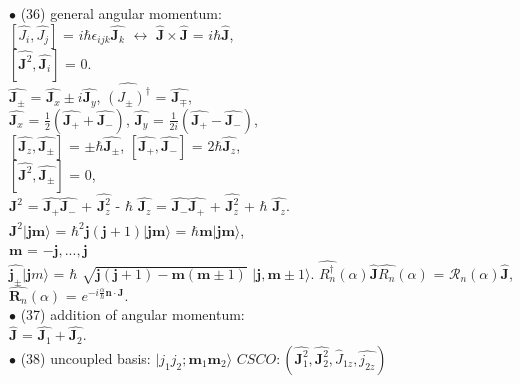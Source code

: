 \documentclass[10pt,fancy]{elegantbook}
\begin{document}
{$\bullet$ (36) general angular momentum: \\
$ [\hat{J_i}, \hat{J_j}]$ = $i \hbar \epsilon_{ijk} \hat{\mathbf J_k}$ $\longleftrightarrow$ $\hat{\mathbf J} \times \hat{\mathbf J}$ = $ i \hbar \hat{\mathbf J}$,  \\
$[\hat{\mathbf J^2},\hat{\mathbf J_i}] $ = 0.  \\  
$ \hat{\mathbf J_ \pm}$ = $\hat{\mathbf J_x} \pm i \hat{\mathbf J_y}$, $ \hat{(J_ \pm)^\dagger}$ = $\hat{\mathbf J_\mp}$, \\
$\hat{\mathbf J_x}$ = $\frac{1}{2} (\hat{\mathbf J_+} + \hat{\mathbf J_-})$, $\hat{\mathbf J_y}$ = $\frac{1}{2i}(\hat{\mathbf J_+} - \hat{\mathbf J_-})$,  \\  
$[\hat{\mathbf J_z}, \hat{\mathbf J_ \pm}]$ = $ \pm \hbar \hat{\mathbf J_ \pm}$, $[\hat{\mathbf J_+}, \hat{\mathbf J_-}]$ = $2 \hbar \hat{\mathbf J_z}$,  \\
$[\hat{\mathbf J^2}, \hat{\mathbf J_\pm}]$ = 0,  \\  
$\hat{\mathbf J^2}$ = $\hat{\mathbf J_+} \hat{\mathbf J_-}$ + $\hat{\mathbf J^2_z}$ - $\hbar$ $\hat{\mathbf J_z}$ = $\hat{\mathbf J_-} \hat{\mathbf J_+}$ + $\hat{\mathbf J^2_z}$ + $\hbar$ $\hat{\mathbf J_z}$.  \\  
$\hat{\mathbf J^2} |{\mathbf {jm}} \rangle$ = $\hbar^2 \mathbf j(\mathbf j + 1) | \mathbf {jm} \rangle$ = $ \hbar \mathbf m | \mathbf {jm} \rangle$,  \\  
$\mathbf m$ = $ - \mathbf j,...,\mathbf j$  \\                           
$\hat{\mathbf j_\pm} | {\mathbf jm} \rangle$ = $\hbar$ $\sqrt{{{\mathbf j} {(\mathbf j + 1)}} - {\mathbf m}{(\mathbf m \pm 1)}}$ $ | \mathbf j, \mathbf m \pm 1 \rangle$.  
$\hat{R^\dagger_n}(\alpha) \hat{\mathbf J} \hat{R_n}(\alpha)$ = $\mathcal R_n (\alpha) \hat{\mathbf J}$,  \\ 
$\hat{\mathbf R_n}(\alpha)$ = $e^{ - i \frac{\alpha}{\hbar} {\mathbf n} \cdot {\mathbf J}}$. \\

$\bullet$ (37) addition of angular momentum:  \\ 
$\hat{\mathbf J}$ = $\hat{\mathbf J_1} + \hat{\mathbf J_2}$.  \\

$\bullet$ (38) uncoupled basis: $ | j_1 j_2; \mathbf m_1 \mathbf m_2 \rangle $ $ CSCO : (\hat{\mathbf J^2_1}, \hat{\mathbf J^2_2}, 
\hat J_{1z}, \hat{j_{2z}})$  \\

}
\end{document}
